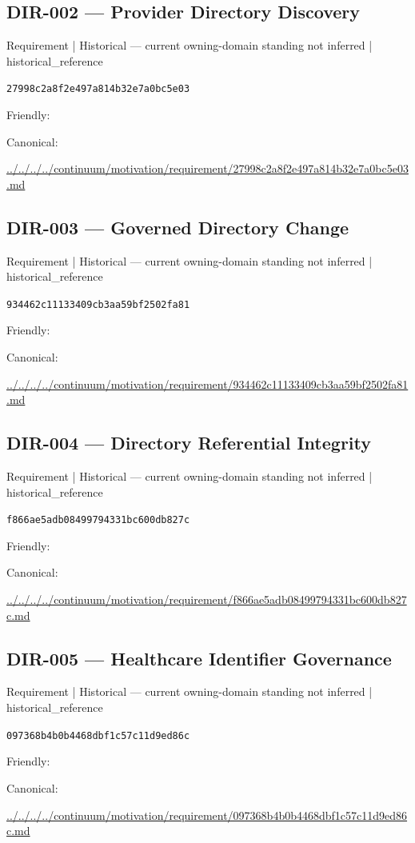 \documentclass[10pt,a4paper]{article}
\begin{document}
\subsection*{DIR-002 — Provider Directory Discovery}
{\small Requirement | Historical — current owning-domain standing not inferred | historical\_reference}\par
\texttt{27998c2a8f2e497a814b32e7a0bc5e03}\par
Friendly: \par
Canonical: \par
{\footnotesize\url{../../../../continuum/motivation/requirement/27998c2a8f2e497a814b32e7a0bc5e03.md}}\par
\subsection*{DIR-003 — Governed Directory Change}
{\small Requirement | Historical — current owning-domain standing not inferred | historical\_reference}\par
\texttt{934462c11133409cb3aa59bf2502fa81}\par
Friendly: \par
Canonical: \par
{\footnotesize\url{../../../../continuum/motivation/requirement/934462c11133409cb3aa59bf2502fa81.md}}\par
\subsection*{DIR-004 — Directory Referential Integrity}
{\small Requirement | Historical — current owning-domain standing not inferred | historical\_reference}\par
\texttt{f866ae5adb08499794331bc600db827c}\par
Friendly: \par
Canonical: \par
{\footnotesize\url{../../../../continuum/motivation/requirement/f866ae5adb08499794331bc600db827c.md}}\par
\subsection*{DIR-005 — Healthcare Identifier Governance}
{\small Requirement | Historical — current owning-domain standing not inferred | historical\_reference}\par
\texttt{097368b4b0b4468dbf1c57c11d9ed86c}\par
Friendly: \par
Canonical: \par
{\footnotesize\url{../../../../continuum/motivation/requirement/097368b4b0b4468dbf1c57c11d9ed86c.md}}\par
\end{document}
